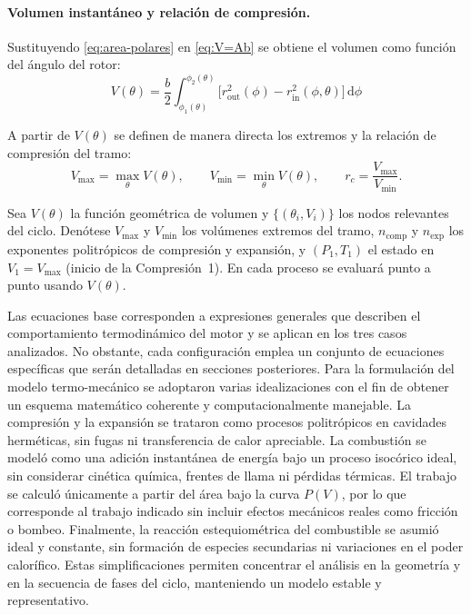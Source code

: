 \documentclass{LS}
\begin{document}
\paragraph{Volumen instantáneo y relación de compresión.}
Sustituyendo \eqref{eq:area-polares} en \eqref{eq:V=Ab} se obtiene el volumen como función del ángulo del rotor:
\begin{equation}
V(\theta) = \frac{b}{2}\int_{\phi_1(\theta)}^{\phi_2(\theta)}
\Big[r_{\text{out}}^2(\phi)-r_{\text{in}}^2(\phi,\theta)\Big]\,
\mathrm{d}\phi
\label{eq:Vtheta-final}
\end{equation}

A partir de \(V(\theta)\) se definen de manera directa los extremos y la relación de compresión del tramo:
\begin{equation}
V_{\max}=\max_{\theta}V(\theta),\qquad
V_{\min}=\min_{\theta}V(\theta),\qquad
r_c=\frac{V_{\max}}{V_{\min}}.
\label{eq:rc}
\end{equation}



Sea $V(\theta)$ la función geométrica de volumen y $\{(\theta_i,V_i)\}$ los nodos relevantes del ciclo. Denótese $V_{\max}$ y $V_{\min}$ los volúmenes extremos del tramo, $n_{\mathrm{comp}}$ y $n_{\mathrm{exp}}$ los exponentes politrópicos de compresión y expansión, y $(P_1,T_1)$ el estado en $V_1=V_{\max}$ (inicio de la Compresión~1). En cada proceso se evaluará punto a punto usando $V(\theta)$.



Las ecuaciones base corresponden a expresiones generales que describen el comportamiento termodinámico del motor y se aplican en los tres casos analizados. No obstante, cada configuración emplea un conjunto de ecuaciones específicas que serán detalladas en secciones posteriores. Para la formulación del modelo termo-mecánico se adoptaron varias idealizaciones con el fin de obtener un esquema matemático coherente y computacionalmente manejable. La compresión y la expansión se trataron como procesos politrópicos en cavidades herméticas, sin fugas ni transferencia de calor apreciable. La combustión se modeló como una adición instantánea de energía bajo un proceso isocórico ideal, sin considerar cinética química, frentes de llama ni pérdidas térmicas. El trabajo se calculó únicamente a partir del área bajo la curva \(P(V)\), por lo que corresponde al trabajo indicado sin incluir efectos mecánicos reales como fricción o bombeo. Finalmente, la reacción estequiométrica del combustible se asumió ideal y constante, sin formación de especies secundarias ni variaciones en el poder calorífico. Estas simplificaciones permiten concentrar el análisis en la geometría y en la secuencia de fases del ciclo, manteniendo un modelo estable y representativo.
\end{document}
